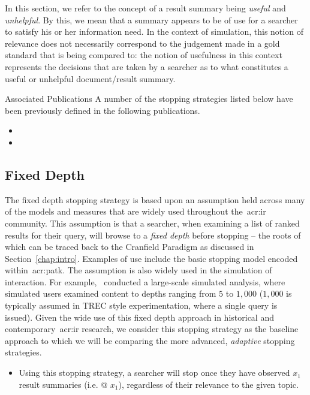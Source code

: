 \noindent{} In this section, we refer to the concept of a result summary being \emph{useful} and \emph{unhelpful}. By this, we mean that a summary appears to be of use for a searcher to satisfy his or her information need. In the context of simulation, this notion of relevance does not necessarily correspond to the judgement made in a gold standard that is being compared to: the notion of usefulness in this context represents the decisions that are taken by a searcher as to what constitutes a useful or unhelpful document/result summary.

\begin{publications_box}{Associated Publications}
A number of the stopping strategies listed below have been previously defined in the following publications.
\vspace*{-2mm}
\begin{itemize}
    \item{}
    \item{}
\end{itemize}
\end{publications_box}

\subsection{Fixed Depth}
The fixed depth stopping strategy is based upon an assumption held across many of the models and measures that are widely used throughout the~\gls{acr:ir} community. This assumption is that a searcher, when examining a list of ranked results for their query, will browse to a \emph{fixed depth} before stopping -- the roots of which can be traced back to the Cranfield Paradigm as discussed in Section~\ref{chap:intro}. Examples of use include the basic stopping model encoded within~\gls{acr:patk}. The assumption is also widely used in the simulation of interaction. For example,~\cite{azzopardi2011economics} conducted a large-scale simulated analysis, where simulated users examined content to depths ranging from $5$ to $1,000$ ($1,000$ is typically assumed in TREC style experimentation, where a single query is issued). Given the wide use of this fixed depth approach in historical and contemporary~\gls{acr:ir} research, we consider this stopping strategy as the baseline approach to which we will be comparing the more advanced, \emph{adaptive} stopping strategies.

\begin{itemize}
    
    \item[]{} Using this stopping strategy, a searcher will stop once they have observed $x_1$ result summaries (i.e.  @ $x_1$), regardless of their relevance to the given topic.
    
\end{itemize}

